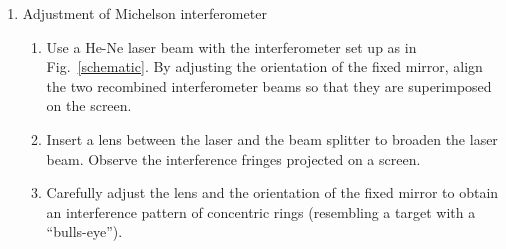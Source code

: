 \documentclass{tufte-handout}
\begin{document}
\begin{enumerate}

\item Adjustment of Michelson interferometer

\begin{enumerate}
\item Use a He-Ne laser beam with the interferometer set up as 
in Fig.~\ref{schematic}. By adjusting the orientation of the fixed mirror, 
align the two recombined interferometer beams so that they are 
superimposed on the screen. 
\item Insert a lens between the laser and the beam splitter to 
broaden the laser beam. Observe the interference fringes projected 
on a screen.
\item Carefully adjust the lens and the orientation of the fixed 
mirror to obtain an interference pattern of concentric rings 
(resembling a target with a ``bulls-eye''). 
\end{enumerate}

%



 


\end{enumerate}
\end{document}
